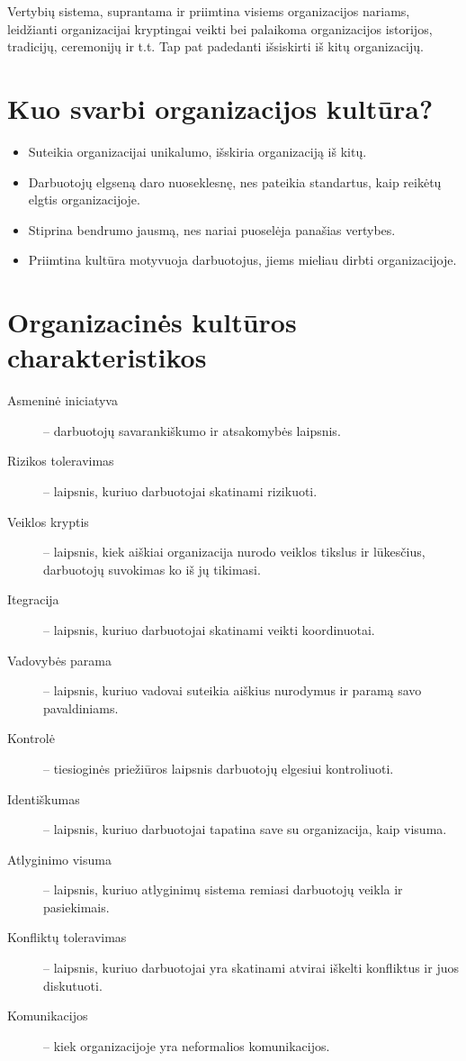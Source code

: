 \begin{defn}
  Vertybių sistema, suprantama ir priimtina visiems organizacijos
  nariams, leidžianti organizacijai kryptingai veikti bei palaikoma
  organizacijos istorijos, tradicijų, ceremonijų ir t.t. Tap pat
  padedanti išsiskirti iš kitų organizacijų.
\end{defn}

\section{Kuo svarbi organizacijos kultūra?}

\begin{itemize}
  \item Suteikia organizacijai unikalumo, išskiria organizaciją iš kitų.
  \item Darbuotojų elgseną daro nuoseklesnę, nes pateikia standartus,
    kaip reikėtų elgtis organizacijoje.
  \item Stiprina bendrumo jausmą, nes nariai puoselėja panašias vertybes.
  \item Priimtina kultūra motyvuoja darbuotojus, jiems mieliau dirbti
    organizacijoje.
\end{itemize}

\section{Organizacinės kultūros charakteristikos}

\begin{description}
  \item[Asmeninė iniciatyva] – darbuotojų savarankiškumo ir atsakomybės
    laipsnis.
  \item[Rizikos toleravimas] – laipsnis, kuriuo darbuotojai skatinami
    rizikuoti.
  \item[Veiklos kryptis] – laipsnis, kiek aiškiai organizacija nurodo
    veiklos tikslus ir lūkesčius, darbuotojų suvokimas ko iš jų tikimasi.
  \item[Itegracija] – laipsnis, kuriuo darbuotojai skatinami veikti
    koordinuotai.
  \item[Vadovybės parama] – laipsnis, kuriuo vadovai suteikia aiškius
    nurodymus ir paramą savo pavaldiniams.
  \item[Kontrolė] – tiesioginės priežiūros laipsnis darbuotojų elgesiui
    kontroliuoti.
  \item[Identiškumas] – laipsnis, kuriuo darbuotojai tapatina save su
    organizacija, kaip visuma.
  \item[Atlyginimo visuma] – laipsnis, kuriuo atlyginimų sistema remiasi
    darbuotojų veikla ir pasiekimais.
  \item[Konfliktų toleravimas] – laipsnis, kuriuo darbuotojai yra skatinami
    atvirai iškelti konfliktus ir juos diskutuoti.
  \item[Komunikacijos] – kiek organizacijoje yra neformalios komunikacijos.
\end{description}

